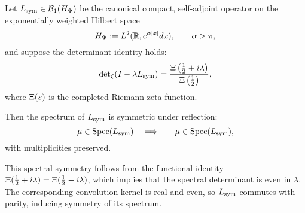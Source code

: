 \begin{lemma}
\label{lem:spectral_symmetry}

Let \( L_{\mathrm{sym}} \in \mathcal{B}_1(H_{\Psi}) \) be the canonical compact, self-adjoint operator on the exponentially weighted Hilbert space
\[
H_{\Psi} := L^2(\mathbb{R}, e^{\alpha |x|} dx), \qquad \alpha > \pi,
\]
and suppose the determinant identity holds:
\[
\det\nolimits_\zeta(I - \lambda L_{\mathrm{sym}}) = \frac{\Xi\left( \tfrac{1}{2} + i\lambda \right)}{\Xi\left( \tfrac{1}{2} \right)},
\]
where \( \Xi(s) \) is the completed Riemann zeta function.

Then the spectrum of \( L_{\mathrm{sym}} \) is symmetric under reflection:
\[
\mu \in \operatorname{Spec}(L_{\mathrm{sym}}) \quad \Longrightarrow \quad -\mu \in \operatorname{Spec}(L_{\mathrm{sym}}),
\]
with multiplicities preserved.

\medskip

\noindent
This spectral symmetry follows from the functional identity \( \Xi(\tfrac{1}{2} + i\lambda) = \Xi(\tfrac{1}{2} - i\lambda) \), which implies that the spectral determinant is even in \( \lambda \). The corresponding convolution kernel is real and even, so \( L_{\mathrm{sym}} \) commutes with parity, inducing symmetry of its spectrum.
\end{lemma}
